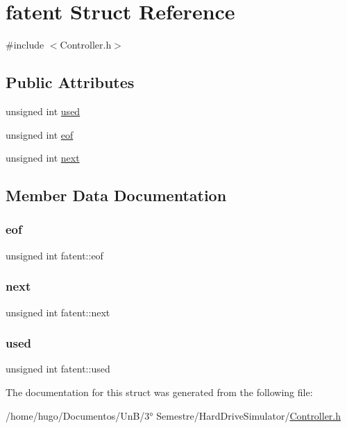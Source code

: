 \hypertarget{structfatent}{}\section{fatent Struct Reference}
\label{structfatent}


{\ttfamily \#include $<$Controller.\+h$>$}

\subsection*{Public Attributes}
\begin{DoxyCompactItemize}
\item 
unsigned int \hyperlink{structfatent_a1363a245cd1121995a64744f77a762fe}{used}
\item 
unsigned int \hyperlink{structfatent_a54eba0b06314f388115878c76609bbb6}{eof}
\item 
unsigned int \hyperlink{structfatent_af2c6af509662bd90905e40a4f9722345}{next}
\end{DoxyCompactItemize}


\subsection{Member Data Documentation}
\mbox{\label{structfatent_a54eba0b06314f388115878c76609bbb6}} 
\subsubsection{\texorpdfstring{eof}{eof}}
{\footnotesize\ttfamily unsigned int fatent\+::eof}

\mbox{\label{structfatent_af2c6af509662bd90905e40a4f9722345}} 
\subsubsection{\texorpdfstring{next}{next}}
{\footnotesize\ttfamily unsigned int fatent\+::next}

\mbox{\label{structfatent_a1363a245cd1121995a64744f77a762fe}} 
\subsubsection{\texorpdfstring{used}{used}}
{\footnotesize\ttfamily unsigned int fatent\+::used}



The documentation for this struct was generated from the following file\+:\begin{DoxyCompactItemize}
\item 
/home/hugo/\+Documentos/\+Un\+B/3° Semestre/\+Hard\+Drive\+Simulator/\hyperlink{Controller_8h}{Controller.\+h}\end{DoxyCompactItemize}
